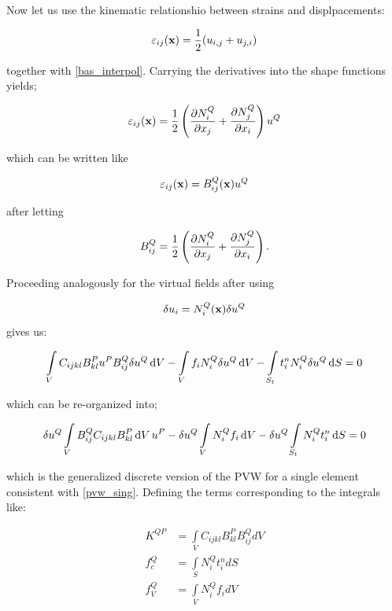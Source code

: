 Now let us use the kinematic relationshio between strains and displpacements:

\[ \varepsilon_{ij}(\vb x) = \frac{1}{2}( u_{i,j} + u_{j,i} ) \]

together with \cref{bas_interpol}. Carrying the derivatives into the shape functions yields;

\[ \varepsilon_{ij}(\vb x) = \frac{1}{2}\left(\pdv{N_i^Q}{x_j} + \pdv{N_j^Q}{x_i} \right){u^Q} \]

which can be written like

\begin{equation}
\varepsilon_{ij}(\vb x) = B_{ij}^Q(\vb x){u^Q}
\label{str-dis}
\end{equation}

after letting

\[ B_{ij}^Q = \frac{1}{2}\left(\pdv{N_i^Q}{x_j} + \pdv{N_j^Q}{x_i} \right). \]

Proceeding analogously for the virtual fields after using

\[ \delta {u_i} = N_i^Q(\vb x)\delta {u^Q} \] gives us:



\[ \int\limits_V C_{ijkl} B_{kl}^P u^P B_{ij}^Q\delta u^Q \dd{V} - \int\limits_V f_i N_i^Q\delta {u^Q}\dd{V}  - \int\limits_{S_t} t_i^n N_i^Q\delta {u^Q} \dd{S} = 0 \]



which can be re-organized into;

\[ \delta {u^Q}\int\limits_V B_{ij}^Q C_{ijkl} B_{kl}^P\dd{V}{u^P} - \delta {u^Q}\int\limits_V N_i^Q{f_i}\dd{V}  - \delta {u^Q}\int\limits_{S_t} N_i^Qt_i^n\dd{S} = 0\]





which is the generalized discrete version of the PVW for a single element consistent with \cref{pvw_sing}. Defining the terms corresponding to the integrals like:


\begin{equation}
\begin{aligned}
{K^{QP}} & = \int\limits_V {{C_{ijkl}}B_{kl}^PB_{ij}^QdV} \\
f_c^Q    & = \int\limits_S {N_i^Qt_i^ndS} \\
f_V^Q    & = \int\limits_V {N_i^Q{f_i}dV}
\label{Rigi_3}
\end{aligned}
\end{equation}



